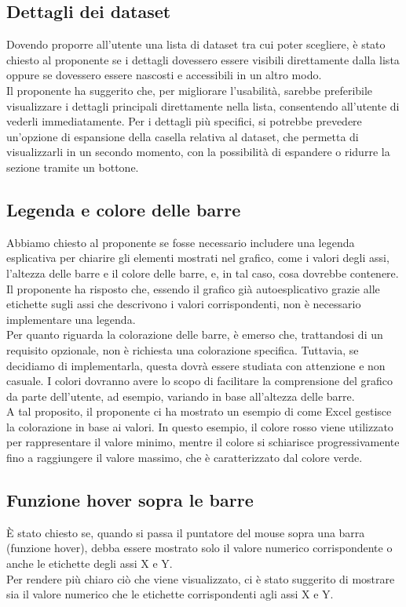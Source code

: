 \subsection{Dettagli dei dataset}
Dovendo proporre all'utente una lista di dataset tra cui poter scegliere, è stato chiesto al proponente se i dettagli dovessero essere visibili direttamente dalla lista oppure se dovessero essere nascosti e accessibili in un altro modo.\\
Il proponente ha suggerito che, per migliorare l'usabilità, sarebbe preferibile visualizzare i dettagli principali direttamente nella lista, consentendo all'utente di vederli immediatamente. Per i dettagli più specifici, si potrebbe prevedere un'opzione di espansione della casella relativa al dataset, che permetta di visualizzarli in un secondo momento, con la possibilità di espandere o ridurre la sezione tramite un bottone.
\subsection{Legenda e colore delle barre}  
Abbiamo chiesto al proponente se fosse necessario includere una legenda esplicativa per chiarire gli elementi mostrati nel grafico, come i valori degli assi, l'altezza delle barre e il colore delle barre, e, in tal caso, cosa dovrebbe contenere.\\
Il proponente ha risposto che, essendo il grafico già autoesplicativo grazie alle etichette sugli assi che descrivono i valori corrispondenti, non è necessario implementare una legenda.  
\\Per quanto riguarda la colorazione delle barre, è emerso che, trattandosi di un requisito opzionale, non è richiesta una colorazione specifica. Tuttavia, se decidiamo di implementarla, questa dovrà essere studiata con attenzione e non casuale. I colori dovranno avere lo scopo di facilitare la comprensione del grafico da parte dell'utente, ad esempio, variando in base all'altezza delle barre.\\
A tal proposito, il proponente ci ha mostrato un esempio di come Excel gestisce la colorazione in base ai valori. In questo esempio, il colore rosso viene utilizzato per rappresentare il valore minimo, mentre il colore si schiarisce progressivamente fino a raggiungere il valore massimo, che è caratterizzato dal colore verde.
\subsection{Funzione hover sopra le barre}
È stato chiesto se, quando si passa il puntatore del mouse sopra una barra (funzione hover), debba essere mostrato solo il valore numerico corrispondente o anche le etichette degli assi X e Y.\\
Per rendere più chiaro ciò che viene visualizzato, ci è stato suggerito di mostrare sia il valore numerico che le etichette corrispondenti agli assi X e Y.
